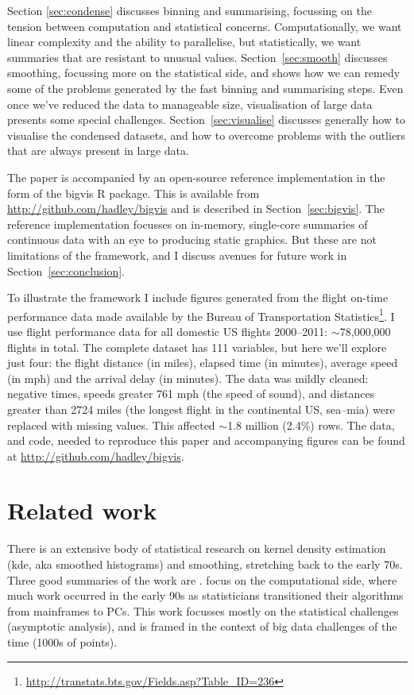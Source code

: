 \documentclass[journal]{vgtc}                %
\begin{document}
Section \ref{sec:condense} discusses binning and summarising, focussing on the tension between computation and statistical concerns. Computationally, we want linear complexity and the ability to parallelise, but statistically, we want summaries that are resistant to unusual values. Section~\ref{sec:smooth} discusses smoothing, focussing more on the statistical side, and shows how we can remedy some of the problems generated by the fast binning and summarising steps. Even once we've reduced the data to manageable size, visualisation of large data presents some special challenges. Section~\ref{sec:visualise} discusses generally how to visualise the condensed datasets, and how to overcome problems with the outliers that are always present in large data.  

The paper is accompanied by an open-source reference implementation in the form of the bigvis R \citep{R} package. This is available from \url{http://github.com/hadley/bigvis} and is described in Section~\ref{sec:bigvis}. The reference implementation focusses on in-memory, single-core summaries of continuous data with an eye to producing static graphics. But these are not limitations of the framework, and I discuss avenues for future work in Section~\ref{sec:conclusion}. 

To illustrate the framework I include figures generated from the flight on-time performance data made available by the Bureau of Transportation Statistics\footnote{\url{http://transtats.bts.gov/Fields.asp?Table_ID=236}}. I use flight performance data for all domestic US flights 2000--2011: $\sim$78,000,000 flights in total. The complete dataset has 111 variables, but here we'll explore just four: the flight distance (in miles), elapsed time (in minutes), average speed (in mph) and the arrival delay (in minutes). The data was mildly cleaned: negative times, speeds greater 761 mph (the speed of sound), and distances greater than 2724 miles (the longest flight in the continental US, {\sc sea}--{\sc mia}) were replaced with missing values. This affected $\sim$1.8 million (2.4\%) rows. The data, and code, needed to reproduce this paper and accompanying figures can be found at \url{http://github.com/hadley/bigvis}.

\section{Related work}
\label{sec:related-work}

There is an extensive body of statistical research on kernel density estimation (kde, aka smoothed histograms) and smoothing, stretching back to the early 70s. Three good summaries of the work are \cite{scott:1992,bowman:1997,loader:1999a}.    \cite{hardle:1992,wand:1994,fan:1994} focus on the computational side, where much work occurred in the early 90s as statisticians transitioned their algorithms from mainframes to PCs. This work focusses mostly on the statistical challenges (asymptotic analysis), and is framed in the context of big data challenges of the time (1000s of points).
\end{document}
